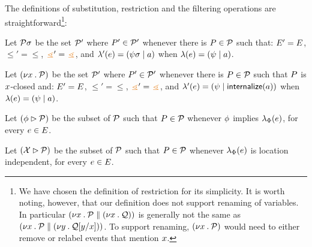 The definitions of substitution, restriction and the filtering operations %
are straightforward\footnote{We have chosen the definition of restriction for
  its simplicity.  It is worth noting, however, that our definition does not
  support renaming of variables.  In particular
  $(\nu x\mathbin.\mathcal{P}\parallel(\nu x\mathbin.\mathcal{Q}))$ is generally not the same
  as $(\nu x\mathbin.\mathcal{P}\parallel(\nu y\mathbin.\mathcal{Q}[y/x]))$.  To
  support renaming, $(\nu x\mathbin.\mathcal{P})$ would need to either remove or
  relabel events that mention $x$.}:
\begin{definition}
  Let $\mathcal{P}\sigma$ be the set $\mathcal{P}'$ where $P'\in\mathcal{P}'$ whenever
there is $P\in\mathcal{P}$ such that:
$E' = E$,
${\le'} = {\le}$, 
${\gtN'} = {\gtN}$,
and
$\lambda'(e) = (\psi\sigma \mid a)$ when $\lambda(e) = (\psi \mid a)$.


Let $(\nu x\mathbin.\mathcal{P})$ be the set $\mathcal{P}'$ where $P'\in\mathcal{P}'$ whenever
there is $P\in\mathcal{P}$ such that $P$ is $x$-closed and:
$E' = E$,
${\le'} = {\le}$, 
${\gtN'} = {\gtN}$,
and
$\lambda'(e) = (\psi \mid \mathsf{internalize}(a))$ when $\lambda(e) = (\psi \mid a)$.

Let $(\phi \mathbin\rhd \mathcal{P})$ be the subset of $\mathcal{P}$ such that $P\in\mathcal{P}$ whenever
$\phi$ implies $\lambda_{\Phi}(e)$, for every $e\in E$. %

Let $(\mathcal{X}\mathbin\rhd \mathcal{P})$ be the subset of $\mathcal{P}$ such that
$P\in\mathcal{P}$ whenever $\lambda_{\Phi}(e)$ is location independent, for every $e\in E$.
\end{definition}


